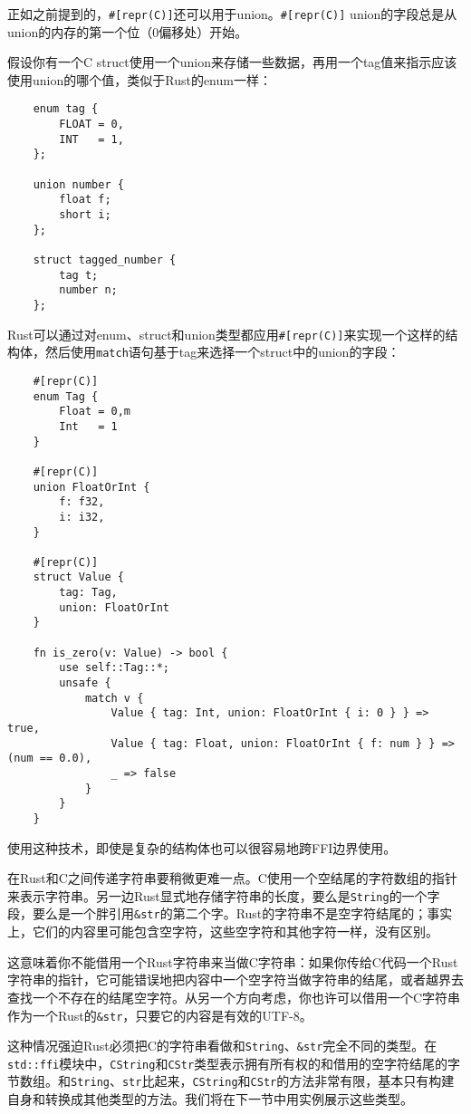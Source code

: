 正如之前提到的，\texttt{\#[repr(C)]}还可以用于union。\texttt{\#[repr(C)]} union的字段总是从union的内存的第一个位（0偏移处）开始。

假设你有一个C struct使用一个union来存储一些数据，再用一个tag值来指示应该使用union的哪个值，类似于Rust的enum一样：
\begin{verbatim}
    enum tag {
        FLOAT = 0,
        INT   = 1,
    };

    union number {
        float f;
        short i;
    };

    struct tagged_number {
        tag t;
        number n;
    };
\end{verbatim}

Rust可以通过对enum、struct和union类型都应用\texttt{\#[repr(C)]}来实现一个这样的结构体，然后使用\texttt{match}语句基于tag来选择一个struct中的union的字段：
\begin{verbatim}
    #[repr(C)]
    enum Tag {
        Float = 0,m
        Int   = 1
    }

    #[repr(C)]
    union FloatOrInt {
        f: f32,
        i: i32,
    }

    #[repr(C)]
    struct Value {
        tag: Tag,
        union: FloatOrInt
    }

    fn is_zero(v: Value) -> bool {
        use self::Tag::*;
        unsafe {
            match v {
                Value { tag: Int, union: FloatOrInt { i: 0 } } => true,
                Value { tag: Float, union: FloatOrInt { f: num } } => (num == 0.0),
                _ => false
            }
        }
    }
\end{verbatim}

使用这种技术，即使是复杂的结构体也可以很容易地跨FFI边界使用。

在Rust和C之间传递字符串要稍微更难一点。C使用一个空结尾的字符数组的指针来表示字符串。另一边Rust显式地存储字符串的长度，要么是\texttt{String}的一个字段，要么是一个胖引用\texttt{\&str}的第二个字。Rust的字符串不是空字符结尾的；事实上，它们的内容里可能包含空字符，这些空字符和其他字符一样，没有区别。

这意味着你不能借用一个Rust字符串来当做C字符串：如果你传给C代码一个Rust字符串的指针，它可能错误地把内容中一个空字符当做字符串的结尾，或者越界去查找一个不存在的结尾空字符。从另一个方向考虑，你也许可以借用一个C字符串作为一个Rust的\texttt{\&str}，只要它的内容是有效的UTF-8。

这种情况强迫Rust必须把C的字符串看做和\texttt{String}、\texttt{\&str}完全不同的类型。在\texttt{std::ffi}模块中，\texttt{CString}和\texttt{CStr}类型表示拥有所有权的和借用的空字符结尾的字节数组。和\texttt{String}、\texttt{str}比起来，\texttt{CString}和\texttt{CStr}的方法非常有限，基本只有构建自身和转换成其他类型的方法。我们将在下一节中用实例展示这些类型。

